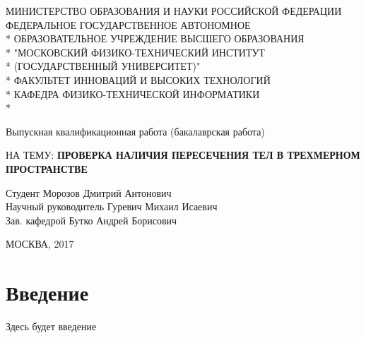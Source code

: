 \documentclass[pdftex,ptm,12pt,a4paper]{report}
\begin{document}
\begin{titlepage}
\newpage

\begin{center}{\small
МИНИСТЕРСТВО ОБРАЗОВАНИЯ И НАУКИ РОССИЙСКОЙ ФЕДЕРАЦИИ \\
\vspace{0.1cm}
ФЕДЕРАЛЬНОЕ ГОСУДАРСТВЕННОЕ АВТОНОМНОЕ  \\*
ОБРАЗОВАТЕЛЬНОЕ УЧРЕЖДЕНИЕ ВЫСШЕГО ОБРАЗОВАНИЯ \\*
"МОСКОВСКИЙ ФИЗИКО-ТЕХНИЧЕСКИЙ ИНСТИТУТ \\*
(ГОСУДАРСТВЕННЫЙ УНИВЕРСИТЕТ)" \\*
\vspace{0.1cm}
ФАКУЛЬТЕТ ИННОВАЦИЙ И ВЫСОКИХ ТЕХНОЛОГИЙ \\*
КАФЕДРА ФИЗИКО-ТЕХНИЧЕСКОЙ ИНФОРМАТИКИ \\*
\hrulefill
}
\end{center}

\begin{center}
\Large Выпускная квалификационная работа (бакалаврская работа)
\end{center}

\vspace{1em}

\begin{center}
\Large НА ТЕМУ:
\linebreak 
\textsc{\large{\textbf{ПРОВЕРКА НАЛИЧИЯ ПЕРЕСЕЧЕНИЯ ТЕЛ В ТРЕХМЕРНОМ ПРОСТРАНСТВЕ}}}
\end{center}

\vspace{4em}

\begin{flushleft}
Студент \hrulefill Морозов Дмитрий Антонович \\
Научный руководитель \hrulefill Гуревич Михаил Исаевич\\
Зав. кафедрой \hrulefill Бутко Андрей Борисович\\ 
\end{flushleft}

\vspace{\fill}

\begin{center}
МОСКВА, 2017
\end{center}

\end{titlepage}

\tableofcontents

\clearpage

\chapter{Введение}
Здесь будет введение
\end{document}
